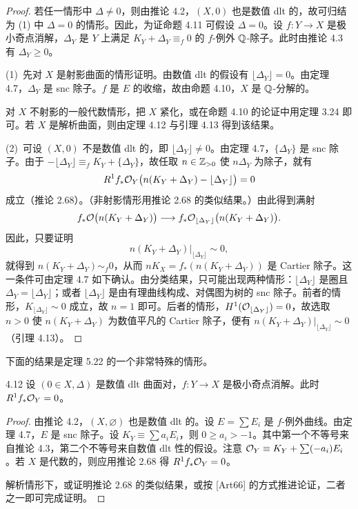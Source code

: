 \begin{proof}
若任一情形中 $\Delta\ne 0$，则由推论 4.2，$(X,0)$ 也是数值 dlt 的，故可归结为 (1) 中 $\Delta=0$ 的情形。因此，为证命题 4.11 可假设 $\Delta=0$。设 $f\colon Y\to X$ 是极小奇点消解，$\Delta_Y$ 是 $Y$ 上满足 $K_Y+\Delta_Y\equiv_f 0$ 的 $f$-例外 $\mathbb{Q}$-除子。此时由推论 4.3 有 $\Delta_Y\ge 0$。

(1)\ 先对 $X$ 是射影曲面的情形证明。由数值 dlt 的假设有 $\lfloor\Delta_Y\rfloor=0$。由定理 4.7，$\Delta_Y$ 是 snc 除子。$f$ 是 $E$ 的收缩，故由命题 4.10，$X$ 是 $\mathbb{Q}$-分解的。

对 $X$ 不射影的一般代数情形，把 $X$ 紧化，或在命题 4.10 的论证中用定理 3.24 即可。若 $X$ 是解析曲面，则由定理 4.12 与引理 4.13 得到该结果。

(2)\ 可设 $(X,0)$ 不是数值 dlt 的，即 $\lfloor\Delta_Y\rfloor\ne 0$。由定理 4.7，$\{\Delta_Y\}$ 是 snc 除子。由于 $-\lfloor\Delta_Y\rfloor\equiv_f K_Y+\{\Delta_Y\}$，故任取 $n\in\mathbb{Z}_{>0}$ 使 $n\Delta_Y$ 为除子，就有
\[
R^1f_*\mathcal{O}_Y\bigl(n(K_Y+\Delta_Y)-\lfloor\Delta_Y\rfloor\bigr)=0
\]
成立（推论 2.68）。（非射影情形用推论 2.68 的类似结果。）由此得到满射
\[
f_*\mathcal{O}\bigl(n(K_Y+\Delta_Y)\bigr)\longrightarrow f_*\mathcal{O}_{\lfloor\Delta_Y\rfloor}\bigl(n(K_Y+\Delta_Y)\bigr).
\]
因此，只要证明
\[
n(K_Y+\Delta_Y)|_{\lfloor\Delta_Y\rfloor}\sim 0 ,
\]
就得到 $n(K_Y+\Delta_Y)\sim_f 0$，从而 $nK_X=f_*(n(K_Y+\Delta_Y))$ 是 Cartier 除子。这一条件可由定理 4.7 如下确认。由分类结果，只可能出现两种情形：$\lfloor\Delta_Y\rfloor$ 是圈且 $\Delta_Y=\lfloor\Delta_Y\rfloor$；或者 $\lfloor\Delta_Y\rfloor$ 是由有理曲线构成、对偶图为树的 snc 除子。前者的情形，$K_{\lfloor\Delta_Y\rfloor}\sim 0$ 成立，故 $n=1$ 即可。后者的情形，$H^1(\mathcal{O}_{\lfloor\Delta_Y\rfloor})=0$，故选取 $n>0$ 使 $n(K_Y+\Delta_Y)$ 为数值平凡的 Cartier 除子，便有 $n(K_Y+\Delta_Y)|_{\lfloor\Delta_Y\rfloor}\sim 0$（引理 4.13）。
\end{proof}

下面的结果是定理 5.22 的一个非常特殊的情形。

\begin{theoremp}{4.12}
设 $(0\in X,\Delta)$ 是数值 dlt 曲面对，$f\colon Y\to X$ 是极小奇点消解。此时 $R^1f_*\mathcal{O}_Y=0$。
\end{theoremp}

\begin{proof}
由推论 4.2，$(X,\varnothing)$ 也是数值 dlt 的。设 $E=\sum E_i$ 是 $f$-例外曲线。由定理 4.7，$E$ 是 snc 除子。设 $K_Y\equiv\sum a_iE_i$，则 $0\ge a_i>-1$。其中第一个不等号来自推论 4.3，第二个不等号来自数值 dlt 性的假设。注意 $\mathcal{O}_Y\equiv K_Y+\sum(-a_i)E_i$。若 $X$ 是代数的，则应用推论 2.68 得 $R^1f_*\mathcal{O}_Y=0$。


解析情形下，或证明推论 2.68 的类似结果，或按 [Art66] 的方式推进论证，二者之一即可完成证明。
\end{proof}

